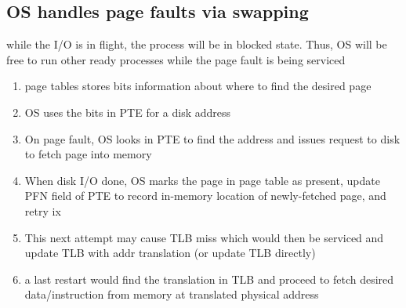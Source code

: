 \documentclass[8pt,a4paper,landscape]{extarticle}
\begin{document}
\begin{multicols*}{3}
\section*{OS handles page faults via swapping}
while the I/O is in flight, the process will be in blocked state. Thus, OS will be free to run other ready processes while the page fault is being serviced
\begin{enumerate}
\item page tables stores bits information about where to find the desired page
\item OS uses the bits in PTE for a disk address
\item On page fault, OS looks in PTE to find the address and issues request to disk to fetch page into memory
\item When disk I/O done, OS marks the page in page table as present, update PFN field of PTE to record in-memory location of newly-fetched page, and retry ix
\item This next attempt may cause TLB miss which would then be serviced and update TLB with addr translation (or update TLB directly)
\item a last restart would find the translation in TLB and proceed to fetch desired data/instruction from memory at translated physical address
\end{enumerate}
\end{multicols*}
\end{document}
